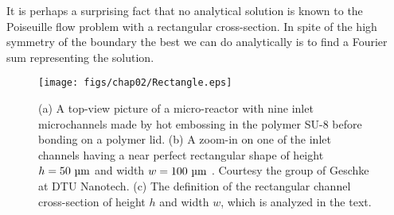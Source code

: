 It is perhaps a surprising fact that no analytical solution is
known to the Poiseuille flow problem with a rectangular
cross-section. In spite of the high symmetry of the boundary the
best we can do analytically is to find a Fourier sum representing
the solution.

\begin{figure}
\centerline{
  \texttt{[image: figs/chap02/Rectangle.eps]}}
\caption[Poiseuille flow: rectangle]{ (a) A
top-view picture of a micro-reactor with nine inlet microchannels
made by hot embossing in the polymer SU-8 before bonding on a
polymer lid. (b) A zoom-in on one of the inlet channels having a
near perfect rectangular shape of height $h=50~\SImum$ and width
$w = 100~\SImum$ . Courtesy the group of Geschke at DTU Nanotech. (c) The definition of the rectangular channel cross-section of height $h$
and width $w$, which is analyzed in the text.}
\end{figure}


